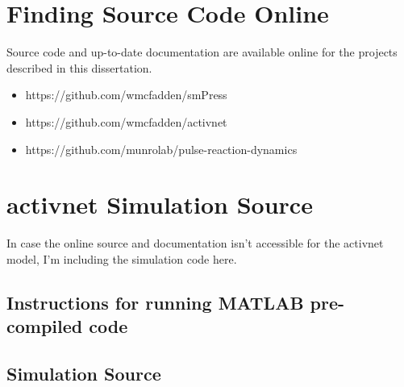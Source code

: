 \section{Finding Source Code Online}

Source code and up-to-date documentation are available online for the projects described in this dissertation.  

\begin{itemize}

\item https://github.com/wmcfadden/smPress
\item https://github.com/wmcfadden/activnet
\item https://github.com/munrolab/pulse-reaction-dynamics

\end{itemize}



\section{activnet Simulation Source}

In case the online source and documentation isn't accessible for the activnet model, I'm including the simulation code here.

\subsection{Instructions for running MATLAB pre-compiled code}


\subsection{Simulation Source}














